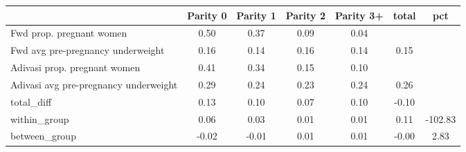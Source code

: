\begin{tabular}{l*{6}{c}}
\toprule
            &\multicolumn{1}{c}{Parity 0}&\multicolumn{1}{c}{Parity 1}&\multicolumn{1}{c}{Parity 2}&\multicolumn{1}{c}{Parity 3+}&\multicolumn{1}{c}{total}&\multicolumn{1}{c}{pct}\\
\midrule
\midrule
Fwd prop. pregnant women&        0.50&        0.37&        0.09&        0.04&            &            \\
Fwd avg pre-pregnancy underweight&        0.16&        0.14&        0.16&        0.14&        0.15&            \\
Adivasi prop. pregnant women&        0.41&        0.34&        0.15&        0.10&            &            \\
Adivasi avg pre-pregnancy underweight&        0.29&        0.24&        0.23&        0.24&        0.26&            \\
total\_diff  &        0.13&        0.10&        0.07&        0.10&       -0.10&            \\
within\_group&        0.06&        0.03&        0.01&        0.01&        0.11&     -102.83\\
between\_group&       -0.02&       -0.01&        0.01&        0.01&       -0.00&        2.83\\
\bottomrule
\end{tabular}
